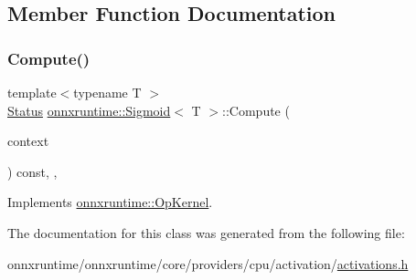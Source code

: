 \subsection{Member Function Documentation}
\mbox{\label{classonnxruntime_1_1Sigmoid_a104d23d42bb1364ff564a52860cb9f9b}} 
\subsubsection{\texorpdfstring{Compute()}{Compute()}}
{\footnotesize\ttfamily template$<$typename T $>$ \\
\mbox{\hyperlink{classonnxruntime_1_1common_1_1Status}{Status}} \mbox{\hyperlink{classonnxruntime_1_1Sigmoid}{onnxruntime\+::\+Sigmoid}}$<$ T $>$\+::Compute (\begin{DoxyParamCaption}\item[{\mbox{\hyperlink{classonnxruntime_1_1OpKernelContext}{Op\+Kernel\+Context}} $\ast$}]{context }\end{DoxyParamCaption}) const\hspace{0.3cm}{\ttfamily [inline]}, {\ttfamily [override]}, {\ttfamily [virtual]}}



Implements \mbox{\hyperlink{classonnxruntime_1_1OpKernel_a9eca8656a78b1b3ab9d3351a12798650}{onnxruntime\+::\+Op\+Kernel}}.



The documentation for this class was generated from the following file\+:\begin{DoxyCompactItemize}
\item 
onnxruntime/onnxruntime/core/providers/cpu/activation/\mbox{\hyperlink{cpu_2activation_2activations_8h}{activations.\+h}}\end{DoxyCompactItemize}
